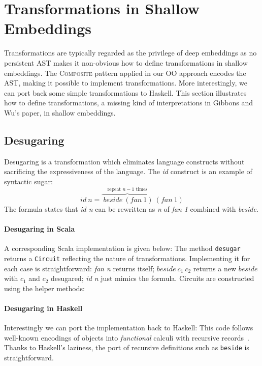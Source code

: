 \section{Transformations in Shallow Embeddings}
Transformations are typically regarded as the privilege of deep embeddings as no
persistent AST makes it non-obvious how to define transformations in shallow embeddings.
The \textsc{Composite} pattern applied in our OO approach encodes the AST, making
it possible to implement transformations. More interestingly, we can port back
some simple transformations to Haskell.
This section illustrates how to define transformations, a missing kind
of interpretations in Gibbons and Wu's paper, in shallow embeddings.

\subsection{Desugaring}
Desugaring is a transformation which eliminates 
language constructs without sacrificing the expressiveness of the language.
The \emph{id} construct is an example of syntactic sugar:
$$id\ n = \overbrace{\ beside\ (fan\ 1)}^{\text{repeat }n-1\text{ times}}\ (fan\ 1)$$
The formula states that \emph{id n} can be rewritten as \emph{n} of \emph{fan 1}
combined with \emph{beside}.

\paragraph{Desugaring in Scala}
A corresponding Scala implementation is given below:
The method \lstinline{desugar} returns a
\lstinline{Circuit} reflecting the nature of transformations.
Implementing it for each case is
straightforward: \emph{fan n} returns itself; $beside\ c_1\ c_2$ returns a new
$beside$ with $c_1$ and $c_2$ desugared; \emph{id n} just mimics the
formula. Circuits are constructed using the helper methods:

\paragraph{Desugaring in Haskell}
Interestingly we can port the implementation back to Haskell:
\noindent This code follows well-known encodings of objects into 
\emph{functional} calculi with recursive records~\cite{bruce97comparing}. Thanks 
to Haskell's laziness, the port of recursive definitions such as
\lstinline{beside} is straightforward.  

